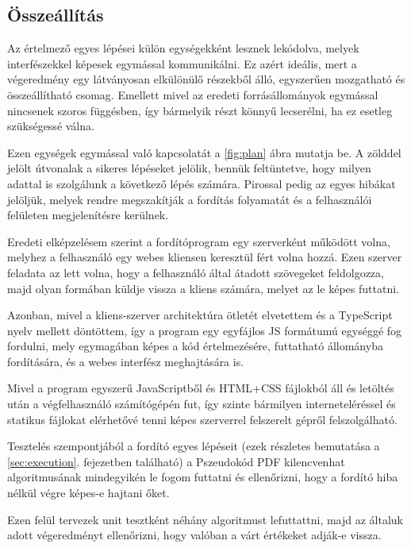 \subsection{Összeállítás}

Az értelmező egyes lépései külön egységekként lesznek lekódolva, melyek interfészekkel képesek egymással kommunikálni. Ez azért ideális, mert a végeredmény egy látványosan elkülönülő részekből álló, egyszerűen mozgatható és összeállítható csomag. Emellett mivel az eredeti forrásállományok egymással nincsenek szoros függésben, így  bármelyik részt könnyű lecserélni, ha ez esetleg szükségessé válna.

Ezen egységek egymással való kapcsolatát a \ref{fig:plan} ábra mutatja be. A zölddel jelölt útvonalak a sikeres lépéseket jelölik, bennük feltüntetve, hogy milyen adattal is szolgálunk a következő lépés számára. Pirossal pedig az egyes hibákat jelöljük, melyek rendre megszakítják a fordítás folyamatát és a felhasználói felületen megjelenítésre kerülnek.


Eredeti elképzelésem szerint a fordítóprogram egy szerverként működött volna, melyhez a felhasználó egy webes kliensen keresztül fért volna hozzá. Ezen szerver feladata az lett volna, hogy a felhasználó által átadott szövegeket feldolgozza, majd olyan formában küldje vissza a kliens számára, melyet az le képes futtatni.

Azonban, mivel a kliens-szerver architektúra ötletét elvetettem és a TypeScript nyelv mellett döntöttem, így a program egy egyfájlos JS formátumú egységgé fog fordulni, mely egymagában képes a kód értelmezésére, futtatható állományba fordítására, és a webes interfész meghajtására is.

Mivel a program egyszerű JavaScriptből és HTML+CSS fájlokból áll és letöltés után a végfelhasználó számítógépén fut, így szinte bármilyen interneteléréssel és statikus fájlokat elérhetővé tenni képes szerverrel felszerelt gépről felszolgálható.

Tesztelés szempontjából a fordító egyes lépéseit (ezek részletes bemutatása a \ref{sec:execution}. fejezetben található) a Pszeudokód PDF kilencvenhat algoritmusának mindegyikén le fogom futtatni és ellenőrizni, hogy a fordító hiba nélkül végre képes-e hajtani őket.

Ezen felül tervezek unit tesztként néhány algoritmust lefuttattni, majd az általuk adott végeredményt ellenőrizni, hogy valóban a várt értékeket adják-e vissza.

